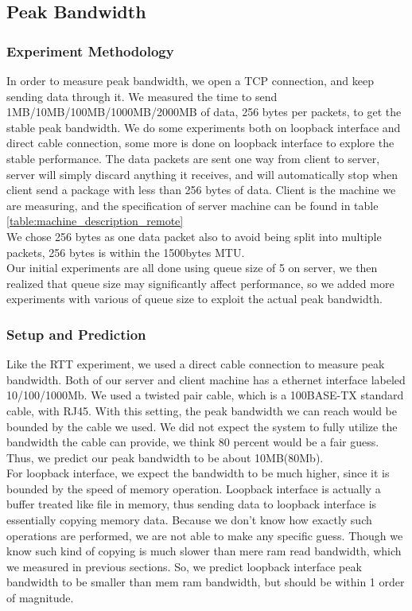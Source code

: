 \documentclass{article} %
\begin{document}
\subsection{Peak Bandwidth}
\subsubsection{Experiment Methodology}
In order to measure peak bandwidth, we open a TCP connection, and keep sending data through it. We measured the time to send 1MB/10MB/100MB/1000MB/2000MB of data, 256 bytes per packets, to get the stable peak bandwidth. We do some experiments both on loopback interface and direct cable connection, some more is done on loopback interface to explore the stable performance. The data packets are sent one way from client to server, server will simply discard anything it receives, and will automatically stop when client send a package with less than 256 bytes of data. Client is the machine we are measuring, and the specification of server machine can be found in table \ref{table:machine_description_remote}\\
We chose 256 bytes as one data packet also to avoid being split into multiple packets, 256 bytes is within the 1500bytes MTU.\\
Our initial experiments are all done using queue size of 5 on server, we then realized that queue size may significantly affect performance, so we added more experiments with various of queue size to exploit the actual peak bandwidth.\\

\subsubsection{Setup and Prediction}
Like the RTT experiment, we used a direct cable connection to measure peak bandwidth. Both of our server and client machine has a ethernet interface labeled 10/100/1000Mb. We used a twisted pair cable, which is a 100BASE-TX standard cable, with RJ45. With this setting, the peak bandwidth we can reach would be bounded by the cable we used. We did not expect the system to fully utilize the bandwidth the cable can provide, we think 80 percent would be a fair guess. Thus, we predict our peak bandwidth to be about 10MB(80Mb).\\
For loopback interface, we expect the bandwidth to be much higher, since it is bounded by the speed of memory operation. Loopback interface is actually a buffer treated like file in memory, thus sending data to loopback interface is essentially copying memory data. Because we don't know how exactly such operations are performed, we are not able to make any specific guess. Though we know such kind of copying is much slower than mere ram read bandwidth, which we measured in previous sections. So, we predict loopback interface peak bandwidth to be smaller than mem ram bandwidth, but should be within 1 order of magnitude. \\
\end{document}
